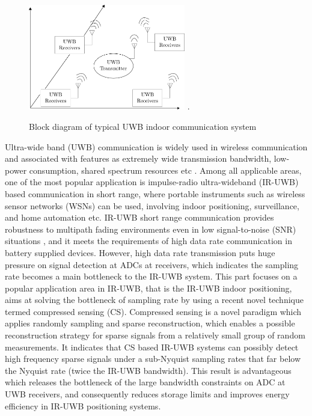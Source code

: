 
\begin{figure}[!t]
\centering
\includegraphics[width=2.7in]{pictures/uwb1.pdf}
\DeclareGraphicsExtensions.
\caption{Block diagram of typical UWB indoor communication system}
\label{uwb1}
\end{figure}

Ultra-wide band (UWB) communication is widely used in wireless communication and associated with features as extremely wide transmission bandwidth, low-power consumption, shared spectrum resources etc \cite{paredes2007ultra}. Among all applicable areas, one of the most popular application is impulse-radio ultra-wideband (IR-UWB) based communication in short range, where portable instruments such as wireless sensor networks (WSNs) can be used, involving indoor positioning, surveillance, and home automation etc. IR-UWB short range communication provides robustness to multipath fading environments even in low signal-to-noise (SNR) situations \cite{cassioli2002ultra}, and it meets the requirements of high data rate communication in battery supplied devices. 
However, high data rate transmission puts huge pressure on signal detection at ADCs at receivers, which indicates the sampling rate becomes a main bottleneck to the IR-UWB system. This part focuses on a popular application area in IR-UWB, that is the IR-UWB indoor positioning, aims at solving the bottleneck of sampling rate by using a recent novel technique termed compressed sensing (CS). Compressed sensing is a novel paradigm which applies randomly sampling and sparse reconstruction, which enables a possible reconstruction strategy for sparse signals from a relatively small group of random measurements. It indicates that CS based IR-UWB systems can possibly detect high frequency sparse signals under a sub-Nyquist sampling rates that far below the Nyquist rate (twice the IR-UWB bandwidth). This result is advantageous which releases the bottleneck of the large bandwidth constraints on ADC at UWB receivers, and consequently reduces storage limits and improves energy efficiency in IR-UWB positioning systems.


